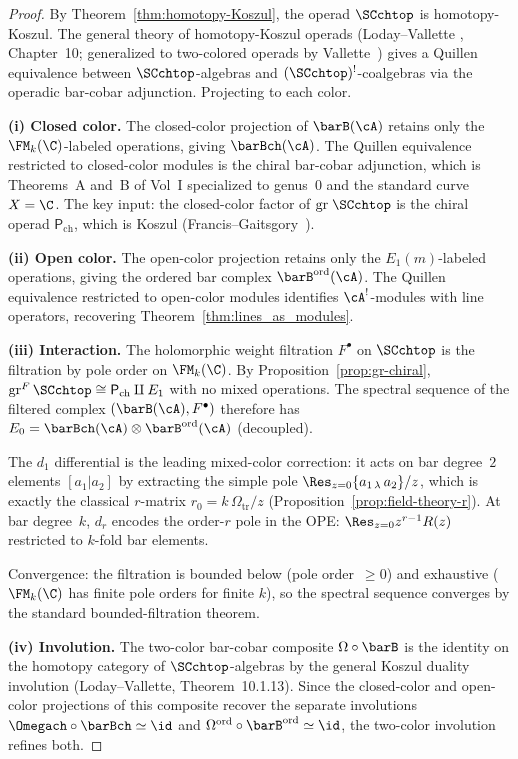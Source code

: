 \begin{proof}
By Theorem~\ref{thm:homotopy-Koszul}, the operad $\SCchtop$
is homotopy-Koszul. The general theory of homotopy-Koszul
operads (Loday--Vallette \cite{LV12}, Chapter~10; generalized
to two-colored operads by Vallette~\cite{Val07}) gives a Quillen
equivalence between $\SCchtop$-algebras and
$(\SCchtop)^!$-coalgebras via the operadic bar-cobar
adjunction. Projecting to each color.

\medskip
\noindent\textbf{(i) Closed color.}
The closed-color projection of $\barB(\cA)$ retains
only the $\FM_k(\C)$-labeled operations, giving $\barBch(\cA)$.
The Quillen equivalence restricted to closed-color modules is
the chiral bar-cobar adjunction, which is Theorems~A and~B
of Vol~I specialized to genus~$0$ and the standard curve
$X = \C$. The key input: the closed-color factor of
$\mathrm{gr}\;\SCchtop$ is the chiral operad
$\mathsf{P}_{\mathrm{ch}}$, which is Koszul
(Francis--Gaitsgory~\cite{FG12}).

\medskip
\noindent\textbf{(ii) Open color.}
The open-color projection retains only the
$E_1(m)$-labeled operations, giving the ordered bar complex
$\barB^{\mathrm{ord}}(\cA)$. The Quillen equivalence
restricted to open-color modules identifies
$\cA^!$-modules with line operators, recovering
Theorem~\ref{thm:lines_as_modules}.

\medskip
\noindent\textbf{(iii) Interaction.}
The holomorphic weight filtration $F^\bullet$ on $\SCchtop$ is
the filtration by pole order on $\FM_k(\C)$. By
Proposition~\ref{prop:gr-chiral},
$\mathrm{gr}^F\,\SCchtop \cong \mathsf{P}_{\mathrm{ch}}
\amalg E_1$ with no mixed operations. The spectral sequence of
the filtered complex $(\barB(\cA), F^\bullet)$
therefore has $E_0 = \barBch(\cA) \otimes
\barB^{\mathrm{ord}}(\cA)$ (decoupled).

The $d_1$ differential is the leading mixed-color correction:
it acts on bar degree~$2$ elements $[a_1 | a_2]$ by extracting
the simple pole $\Res_{z=0} \{a_{1\,\lambda}\, a_2\}/z$,
which is exactly the classical $r$-matrix $r_0 = k\,\Omega_{\mathrm{tr}}/z$
(Proposition~\ref{prop:field-theory-r}). At bar degree~$k$,
$d_r$ encodes the order-$r$ pole in the OPE:
$\Res_{z=0} z^{r-1} R(z)$ restricted to $k$-fold bar elements.

Convergence: the filtration is bounded below
(pole order~$\ge 0$) and exhaustive ($\FM_k(\C)$ has finite
pole orders for finite $k$), so the spectral sequence converges
by the standard bounded-filtration theorem.

\medskip
\noindent\textbf{(iv) Involution.}
The two-color bar-cobar composite
$\Omega \circ \barB$ is the identity on
the homotopy category of $\SCchtop$-algebras by the general
Koszul duality involution (Loday--Vallette, Theorem~10.1.13).
Since the closed-color and open-color projections of this
composite recover the separate involutions $\Omegach \circ
\barBch \simeq \id$ and
$\Omega^{\mathrm{ord}} \circ \barB^{\mathrm{ord}} \simeq
\id$, the two-color involution refines both.
\end{proof}

